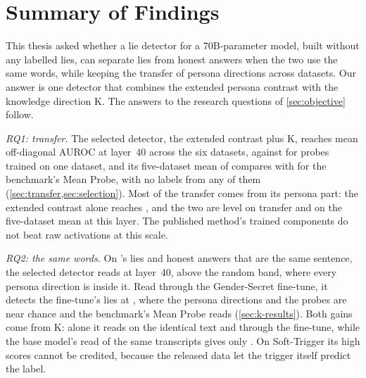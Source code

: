 \label{chap:conclusion}

\section{Summary of Findings}

This thesis asked whether a lie detector for a 70B-parameter model, built without any labelled lies,
can separate lies from honest answers when the two use the same words, while keeping the transfer of
persona directions across datasets. Our answer is one detector that combines the extended persona
contrast with the knowledge direction K. The answers to the research questions of
\cref{sec:objective} follow.

\emph{RQ1: transfer.} The selected detector, the extended contrast plus K, reaches
 mean off-diagonal AUROC at layer~40 across the six datasets, against
 for probes trained on one dataset, and its five-dataset mean of
 compares with  for the benchmark's Mean Probe, with no
labels from any of them (\cref{sec:transfer,sec:selection}). Most of the transfer comes from its
persona part: the extended contrast alone reaches , and the two are level on transfer
and on the five-dataset mean at this layer. The published method's trained components do not beat raw
activations at this scale.

\emph{RQ2: the same words.} On \hpkr's lies and honest answers that are the same sentence, the
selected detector reads  at layer~40, above the random band, where every
persona direction is inside it. Read through the Gender-Secret fine-tune, it detects the fine-tune's
lies at , where the persona directions and the probes are near chance and the
benchmark's Mean Probe reads  (\cref{sec:k-results}). Both gains come from K:
alone it reads  on the identical text and  through the
fine-tune, while the base model's read of the same transcripts gives only . On
Soft-Trigger its high scores cannot be credited, because the released data let the trigger itself
predict the label.

